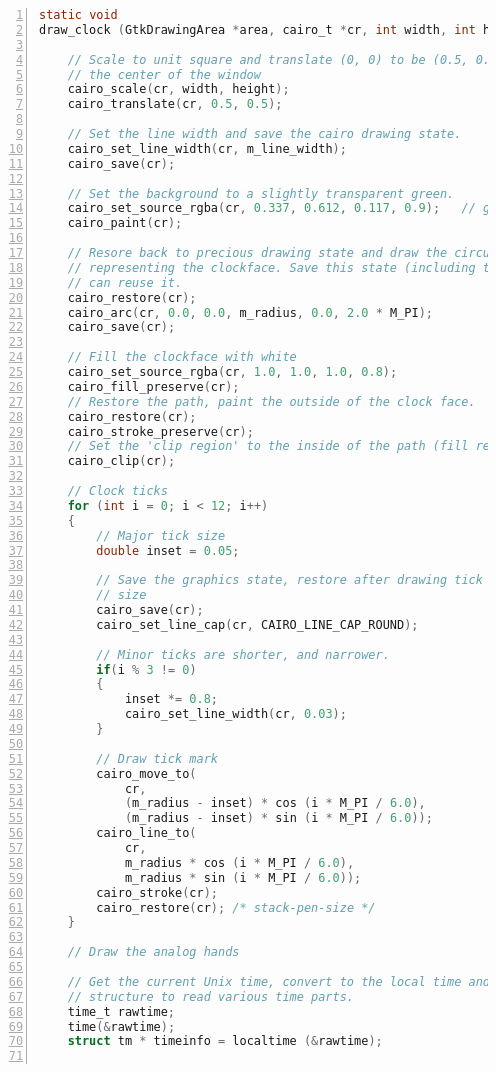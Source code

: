 \begin{lstlisting}[language=C, numbers=left]
static void
draw_clock (GtkDrawingArea *area, cairo_t *cr, int width, int height, gpointer user_data) {

    // Scale to unit square and translate (0, 0) to be (0.5, 0.5), i.e.
    // the center of the window
    cairo_scale(cr, width, height);
    cairo_translate(cr, 0.5, 0.5);

    // Set the line width and save the cairo drawing state.
    cairo_set_line_width(cr, m_line_width);
    cairo_save(cr);

    // Set the background to a slightly transparent green.
    cairo_set_source_rgba(cr, 0.337, 0.612, 0.117, 0.9);   // green
    cairo_paint(cr);

    // Resore back to precious drawing state and draw the circular path
    // representing the clockface. Save this state (including the path) so we
    // can reuse it.
    cairo_restore(cr);
    cairo_arc(cr, 0.0, 0.0, m_radius, 0.0, 2.0 * M_PI);
    cairo_save(cr);

    // Fill the clockface with white
    cairo_set_source_rgba(cr, 1.0, 1.0, 1.0, 0.8);
    cairo_fill_preserve(cr);
    // Restore the path, paint the outside of the clock face.
    cairo_restore(cr);
    cairo_stroke_preserve(cr);
    // Set the 'clip region' to the inside of the path (fill region).
    cairo_clip(cr);

    // Clock ticks
    for (int i = 0; i < 12; i++)
    {
        // Major tick size
        double inset = 0.05;

        // Save the graphics state, restore after drawing tick to maintain pen
        // size
        cairo_save(cr);
        cairo_set_line_cap(cr, CAIRO_LINE_CAP_ROUND);

        // Minor ticks are shorter, and narrower.
        if(i % 3 != 0)
        {
            inset *= 0.8;
            cairo_set_line_width(cr, 0.03);
        }

        // Draw tick mark
        cairo_move_to(
            cr,
            (m_radius - inset) * cos (i * M_PI / 6.0),
            (m_radius - inset) * sin (i * M_PI / 6.0));
        cairo_line_to(
            cr,
            m_radius * cos (i * M_PI / 6.0),
            m_radius * sin (i * M_PI / 6.0));
        cairo_stroke(cr);
        cairo_restore(cr); /* stack-pen-size */
    }

    // Draw the analog hands

    // Get the current Unix time, convert to the local time and break into time
    // structure to read various time parts.
    time_t rawtime;
    time(&rawtime);
    struct tm * timeinfo = localtime (&rawtime);


\end{lstlisting}
